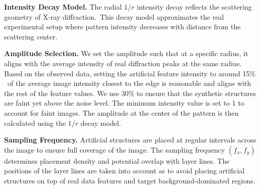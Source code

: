 \documentclass[iucr,review]{iucrjournals}
\begin{document}



\textbf{Intensity Decay Model.}
The radial $1/r$ intensity decay reflects the scattering geometry of X-ray diffraction.\
This decay model approximates
the real experimental setup
where pattern intensity decreases with distance from the scattering center.

\textbf{Amplitude Selection.}
We set the amplitude such that at a specific radius, it aligns with
the average intensity of real diffraction peaks at the same radius.
Based on the observed data, setting the artificial feature intensity to around 15\% \
of the average image intensity closest to the edge is reasonable and aligns with the rest of the feature values. 
We use 30\% to ensure that the synthetic structures are faint yet
above the noise level. The minimum intensity value is set to 1 to account for faint images.
The amplitude at the center of the pattern is then calculated using the $1/r$ decay model.




\textbf{Sampling Frequency.}
Artificial structures are placed at regular intervals across the image to ensure full coverage of the image.
The sampling frequency $(f_x, f_y)$ determines placement density and potential overlap with layer lines.
The positions of the layer lines are taken 
into account as to avoid placing artificial structures on top of real data features and target background-dominated regions. 
\end{document}

